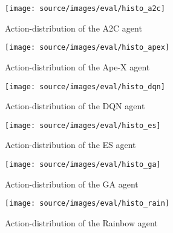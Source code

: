 \begin{figure}%
\centering
\texttt{[image: source/images/eval/histo\_a2c]}%
\caption{Action-distribution of the A2C agent}%
\label{}%
\end{figure}

\begin{figure}%
\centering
\texttt{[image: source/images/eval/histo\_apex]}%
\caption{Action-distribution of the Ape-X agent}%
\label{}%
\end{figure}

\begin{figure}%
\centering
\texttt{[image: source/images/eval/histo\_dqn]}%
\caption{Action-distribution of the DQN agent}%
\label{}%
\end{figure}

\begin{figure}%
\centering
\texttt{[image: source/images/eval/histo\_es]}%
\caption{Action-distribution of the ES agent}%
\label{}%
\end{figure}

\begin{figure}%
\centering
\texttt{[image: source/images/eval/histo\_ga]}%
\caption{Action-distribution of the GA agent}%
\label{}%
\end{figure}

\begin{figure}%
\centering
\texttt{[image: source/images/eval/histo\_rain]}%
\caption{Action-distribution of the Rainbow agent}%
\label{}%
\end{figure}
